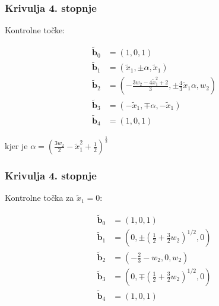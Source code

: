 \documentclass[a4paper, 12pt]{beamer}
\theoremstyle{definition}
\theoremstyle{plain}
\begin{document}
    

\begin{frame}
\frametitle{Krivulja 4. stopnje} 
    Kontrolne točke:
 
        \begin{align*}
            \boldsymbol{\tilde{b}}_0 &= (1,0,1) \\
            \boldsymbol{\tilde{b}}_1 &= (\tilde{x}_1,\pm\alpha,\tilde{x}_1) \\
            \boldsymbol{\tilde{b}}_2 &= (-\frac{3w_2-4\tilde{x}_1^2+2}{3},\pm\frac{4}{3}\tilde{x}_1\alpha,w_2) \\
            \boldsymbol{\tilde{b}}_3 &= (-\tilde{x}_1,\mp\alpha,-\tilde{x}_1) \\
            \boldsymbol{\tilde{b}}_4 &= (1,0,1)
        \end{align*}
    
        kjer je $\alpha=(\frac{3w_2}{2}-\tilde{x}_1^2+\frac{1}{2})^{\frac{1}{2}}$
   
   
\end{frame}


\begin{frame}
\frametitle{Krivulja 4. stopnje}
    Kontrolne točka za $\tilde{x}_1=0$:

        \begin{align*}
            \boldsymbol{\tilde{b}}_0 &= (1,0,1) \\
            \boldsymbol{\tilde{b}}_1 &= (0,\pm (\frac{1}{2}+\frac{3}{2}w_2)^{1/2},0) \\
            \boldsymbol{\tilde{b}}_2 &= (-\frac{2}{3}-w_2,0,w_2) \\
            \boldsymbol{\tilde{b}}_3 &= (0,\mp(\frac{1}{2}+\frac{3}{2}w_2)^{1/2},0) \\
            \boldsymbol{\tilde{b}}_4 &= (1,0,1)
        \end{align*}
  
    
\end{frame}
    
    
\end{document}

